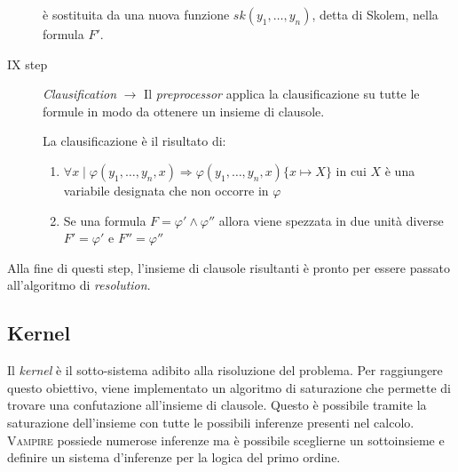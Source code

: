 \begin{description}
\begin{definition}
        è sostituita da una nuova funzione $sk(y_1,\dots,y_n)$, detta di Skolem, nella formula $F'$.
    \end{definition}
    \item[IX step] \emph{Clausification} $\longrightarrow$ Il \emph{preprocessor} applica la clausificazione su tutte le formule in modo da ottenere 
    un insieme di clausole.
    \begin{definition}
        La clausificazione è il risultato di:
        \begin{enumerate}
            \item $\forall x\mid\varphi(y_1,\dots,y_n,x)\Rightarrow\varphi(y_1,\dots,y_n,x)\{x \mapsto X\}$  in cui $X$ è una variabile designata che non occorre in $\varphi$
            \item Se una formula $F=\varphi'\land\varphi''$ allora viene spezzata in due unità diverse 
            $F'=\varphi'$ e $F''=\varphi''$
        \end{enumerate}
    \end{definition}  
\end{description} 
Alla fine di questi step, l'insieme di clausole risultanti è pronto per essere passato all'algoritmo di \emph{resolution}.
\subsection{Kernel}
Il \emph{kernel} è il sotto-sistema adibito alla risoluzione del problema. Per raggiungere questo obiettivo, 
viene implementato un algoritmo di saturazione che permette di trovare una confutazione all'insieme di clausole.
Questo è possibile tramite la saturazione dell'insieme con tutte le possibili inferenze presenti nel calcolo. 
\textsc{Vampire} possiede numerose inferenze ma è possibile sceglierne un sottoinsieme e definire un sistema 
d'inferenze per la logica del primo ordine.

